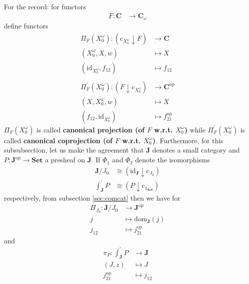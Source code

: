 For the record: for functors
\begin{align*}
  F
  \colon
  \mathbf{C}
  &\rightarrow
  \mathbf{C}_{\omega}
\end{align*}
define functors
\begin{align*}
  \Pi_{F}(X_{0}^{\omega})
  \colon
  \left(
    \mathrm{c}_{X_{0}^{\omega}}
    \downarrow
    F
  \right)
  &\rightarrow
  \mathbf{C}
  \\
  (X_{0}^{\omega},X,w)
  &\mapsto
  X
  \\
  \left(
    \mathrm{id}_{X_{0}^{\omega}},
    f_{12}
  \right)
  &\mapsto
  f_{12}
  \\\\
  \Pi_{F}^{\prime}(X_{0}^{\omega})
  \colon
  \left(
    F
    \downarrow
    \mathrm{c}_{X_{0}^{\omega}}
  \right)
  &\rightarrow
  \mathbf{C}^{\textrm{op}}
  \\
  (X,X_{0}^{\omega},w)
  &\mapsto
  X
  \\
  \left(
    f_{12},
    \mathrm{id}_{X_{0}^{\omega}}
  \right)
  &\mapsto
  f_{21}^{\textrm{op}}
\end{align*}
$\Pi_{F}(X_{0}^{\omega})$ is called \textbf{canonical projection (of $F$ w.r.t. $X_{0}^{\omega}$)} while $\Pi_{F}^{\prime}(X_{0}^{\omega})$ is called \textbf{canonical coprojection (of $F$ w.r.t. $X_{0}^{\omega}$)}. Furthermore, for this subsubsection, let us make the agreement that $\mathbf{J}$ denotes a small category and $P \colon \mathbf{J}^{\textrm{op}} \rightarrow \mathbf{Set}$ a presheaf on $\mathbf{J}$. If $\Phi_{1}$ and $\Phi_{2}$ denote the isomorphisms
\begin{align*}
  \mathbf{J}
  \slash
  J_{0}
  &\cong
  \left(
    \mathrm{id}_{\mathbf{J}}
    \downarrow
    \mathrm{c}_{J_{0}}
  \right)
  \\
  \int_{\mathbf{J}}^{\prime}
  P
  &\cong
  \left(
    P
    \downarrow
    \mathrm{c}_{1_{\mathbf{Set}}}
  \right)
\end{align*}
respectively, from subsection \ref{sec:comcat} then we have for
\begin{align*}
  \Pi_{J_{0}}
  \colon
  \mathbf{J}
  \slash
  J_{0}
  &\rightarrow
  \mathbf{J}^{\textrm{op}}
  \\
  j
  &\mapsto
  \mathrm{dom}_{\mathbf{J}}(j)
  \\
  j_{12}
  &\mapsto
  j_{21}^{\textrm{op}}
\end{align*}
and
\begin{align*}
  \pi_{P}
  \colon
  \int_{\mathbf{J}}^{\prime}
  P
  &\rightarrow
  \mathbf{J}
  \\
  (J,z)
  &\mapsto
  J
  \\
  j_{21}^{\textrm{op}}
  &\mapsto
  j_{12}
\end{align*}
